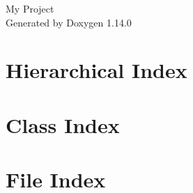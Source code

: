 \documentclass[twoside]{book}
\newcommand{\+}{\discretionary{\mbox{\scriptsize$\hookleftarrow$}}{}{}}
\newcommand{\clearemptydoublepage}{%
    \newpage{\pagestyle{empty}\cleardoublepage}%
  }
\begin{document}
  \raggedbottom
    \hypersetup{pageanchor=false,
                bookmarksnumbered=true,
                pdfencoding=unicode
               }
  \begin{titlepage}
  \vspace*{7cm}
  \begin{center}%
  {\Large My Project}\\
  \vspace*{1cm}
  {\large Generated by Doxygen 1.14.0}\\
  \end{center}
  \end{titlepage}
  \clearemptydoublepage
  \tableofcontents
  \clearemptydoublepage
  \hypersetup{pageanchor=true}
\chapter{Hierarchical Index}

\chapter{Class Index}

\chapter{File Index}

\end{document}

